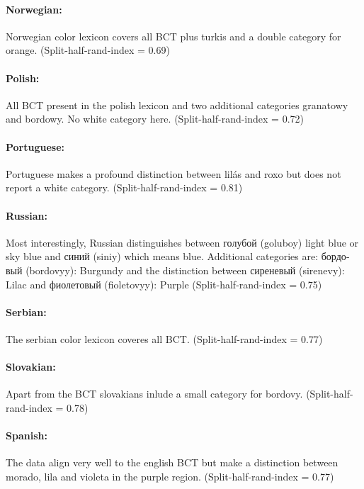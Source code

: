 \paragraph{Norwegian:}
Norwegian color lexicon covers all BCT plus turkis and a double category for orange.
(Split-half-rand-index = 0.69)

\paragraph{Polish:}
All BCT present in the polish lexicon and two additional categories granatowy and bordowy. No white category here.
(Split-half-rand-index = 0.72)

\paragraph{Portuguese:}
Portuguese makes a profound distinction between lilás and roxo but does not report a white category.
(Split-half-rand-index = 0.81)

\paragraph{Russian:}
Most interestingly, Russian distinguishes between \textrussian{голубой} (goluboy) light blue or sky blue and \textrussian{синий} (siniy) which means blue.
Additional categories are: \textrussian{бордовый} (bordovyy): Burgundy and the distinction between \textrussian{сиреневый} (sirenevy): Lilac and \textrussian{фиолетовый} (fioletovyy): Purple
(Split-half-rand-index = 0.75)

\paragraph{Serbian:}
The serbian color lexicon coveres all BCT.
(Split-half-rand-index = 0.77)


\paragraph{Slovakian:}
Apart from the BCT slovakians inlude a small category for bordovy.
(Split-half-rand-index = 0.78)

\paragraph{Spanish:}
The data align very well to the english BCT but make a distinction between morado, lila and violeta in the purple region.
(Split-half-rand-index = 0.77)

